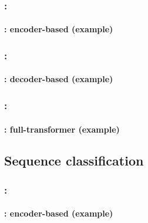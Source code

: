 \documentclass[xcolor=table]{beamer}
\begin{document}
\begin{frame}
	\frametitle{\insertshortsubtitle: \insertsection}
	\framesubtitle{\insertsubsection: encoder-based (example)}
	
	\begin{center}
	\end{center}
	
\end{frame}

\begin{frame}
	\frametitle{\insertshortsubtitle: \insertsection}
	\framesubtitle{\insertsubsection: decoder-based (example)}
	
	
\end{frame}

\begin{frame}
	\frametitle{\insertshortsubtitle: \insertsection}
	\framesubtitle{\insertsubsection: full-transformer (example)}
	
	
\end{frame}


\subsection{Sequence classification}

\begin{frame}
	\frametitle{\insertshortsubtitle: \insertsection}
	\framesubtitle{\insertsubsection: encoder-based (example)}
	
	\begin{center}
	\end{center}
	
\end{frame}
\end{document}
